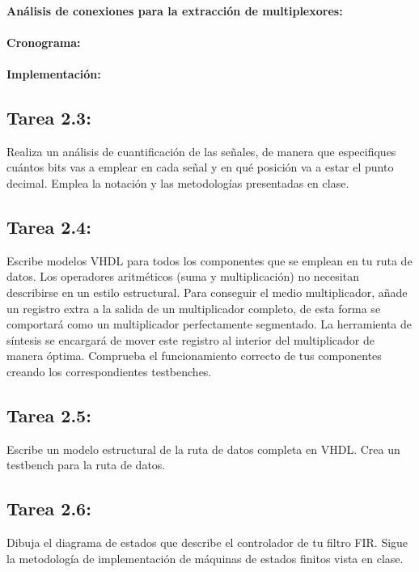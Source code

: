 \documentclass{article}
\begin{document}
\paragraph{Análisis de conexiones para la extracción de multiplexores:}


\paragraph{Cronograma:}
\paragraph{Implementación:}
\subsection{Tarea 2.3:}

Realiza un análisis de cuantificación de las señales, de manera que especifiques cuántos bits vas a emplear en cada señal y en qué posición va a estar el punto decimal. Emplea la notación y las metodologías presentadas en clase.

\subsection{Tarea 2.4:}

Escribe modelos VHDL para todos los componentes que se emplean en tu ruta de datos. Los operadores aritméticos (suma y multiplicación) no necesitan describirse en un estilo estructural. Para conseguir el medio multiplicador, añade un registro extra a la salida de un multiplicador completo, de esta forma se comportará como un multiplicador perfectamente segmentado. La herramienta de síntesis se encargará de mover este registro al interior del multiplicador de manera óptima. Comprueba el funcionamiento correcto de tus componentes creando los correspondientes testbenches.

\subsection{Tarea 2.5:}
Escribe un modelo estructural de la ruta de datos completa en VHDL. Crea un testbench para la ruta de datos.

\subsection{Tarea 2.6:}

Dibuja el diagrama de estados que describe el controlador de tu filtro FIR. Sigue la metodología de implementación de máquinas de estados finitos vista en clase.
\end{document}
